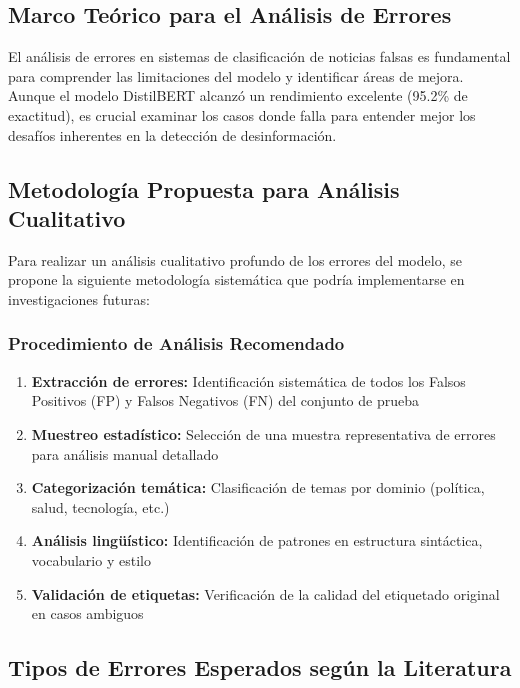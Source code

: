 \subsection{Marco Teórico para el Análisis de Errores}

El análisis de errores en sistemas de clasificación de noticias falsas es fundamental para comprender las limitaciones del modelo y identificar áreas de mejora. Aunque el modelo DistilBERT alcanzó un rendimiento excelente (95.2\% de exactitud), es crucial examinar los casos donde falla para entender mejor los desafíos inherentes en la detección de desinformación.

\subsection{Metodología Propuesta para Análisis Cualitativo}

Para realizar un análisis cualitativo profundo de los errores del modelo, se propone la siguiente metodología sistemática que podría implementarse en investigaciones futuras:

\subsubsection{Procedimiento de Análisis Recomendado}

\begin{enumerate}
    \item \textbf{Extracción de errores:} Identificación sistemática de todos los Falsos Positivos (FP) y Falsos Negativos (FN) del conjunto de prueba
    \item \textbf{Muestreo estadístico:} Selección de una muestra representativa de errores para análisis manual detallado
    \item \textbf{Categorización temática:} Clasificación de temas por dominio (política, salud, tecnología, etc.)
    \item \textbf{Análisis lingüístico:} Identificación de patrones en estructura sintáctica, vocabulario y estilo
    \item \textbf{Validación de etiquetas:} Verificación de la calidad del etiquetado original en casos ambiguos
\end{enumerate}

\subsection{Tipos de Errores Esperados según la Literatura}

